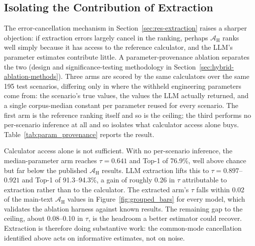 \documentclass[final,3p,times]{elsarticle}
\begin{document}
\subsection{Isolating the Contribution of Extraction}
\label{sec:res-paramprov}
The error-cancellation mechanism in Section~\ref{sec:res-extraction} raises a sharper objection: if extraction errors largely cancel in the ranking, perhaps $\mathcal{A}_{\text{H}}$ ranks well simply because it has access to the reference calculator, and the LLM's parameter estimates contribute little. A parameter-provenance ablation separates the two (design and significance-testing methodology in Section~\ref{sec:hybrid-ablation-methods}). Three arms are scored by the same calculators over the same 195 test scenarios, differing only in where the withheld engineering parameters come from: the scenario's true values, the values the LLM actually returned, and a single corpus-median constant per parameter reused for every scenario. The first arm is the reference ranking itself and so is the ceiling; the third performs no per-scenario inference at all and so isolates what calculator access alone buys. Table~\ref{tab:param_provenance} reports the result.

Calculator access alone is not sufficient. With no per-scenario inference, the median-parameter arm reaches $\tau = 0.641$ and Top-1 of 76.9\%, well above chance but far below the published $\mathcal{A}_{\text{H}}$ results. LLM extraction lifts this to $\tau = 0.897$--$0.921$ and Top-1 of 91.3--94.3\%, a gain of roughly 0.26 in $\tau$ attributable to extraction rather than to the calculator. The extracted arm's $\tau$ falls within 0.02 of the main-text $\mathcal{A}_{\text{H}}$ values in Figure~\ref{fig:grouped_bars} for every model, which validates the ablation harness against known results. The remaining gap to the ceiling, about 0.08--0.10 in $\tau$, is the headroom a better estimator could recover. Extraction is therefore doing substantive work: the common-mode cancellation identified above acts on informative estimates, not on noise.
\end{document}
